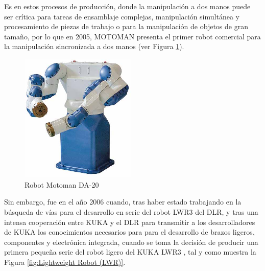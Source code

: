   
Es en estos procesos de producción, donde la manipulación a dos manos puede ser crítica para tareas de ensamblaje complejas, manipulación simultánea
y procesamiento de piezas de trabajo o para la manipulación de objetos de gran tamaño, por lo que en 2005, MOTOMAN presenta el primer robot comercial para la manipulación sincronizada a dos manos \cite{Siciliano16} (ver Figura \ref{fig:MOTOMAN}).\\

  \begin{figure} [H]
    \begin{center}
      \includegraphics[width=55mm]{figs/MOTOMAN.jpg}
    \end{center}
    \caption{Robot Motoman DA-20}
    \label{fig:MOTOMAN}
  \end{figure}
  
Sin embargo, fue en el año 2006 cuando, tras haber estado trabajando en la búsqueda de vías para el desarrollo en serie del robot LWR3 del DLR, y tras una intensa cooperación entre KUKA y el DLR para transmitir a los desarrolladores de KUKA los conocimientos necesarios para para el desarrollo de brazos ligeros, componentes y electrónica integrada, cuando se toma la decisión de producir una primera pequeña serie del robot ligero del KUKA LWR3 \cite{Bischoff10}, tal y como muestra la Figura \ref{fig:Lightweight Robot (LWR)}.
  
